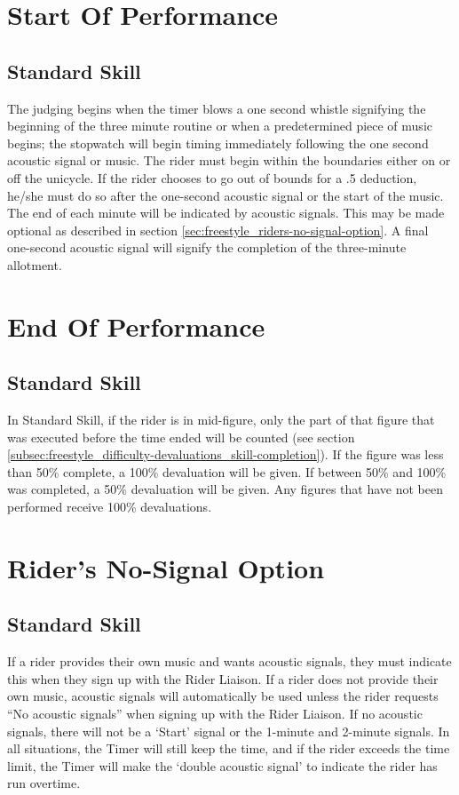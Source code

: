 \section{Start Of Performance}

\subsection{Standard Skill}
The judging begins when the timer blows a one second whistle signifying the beginning of the three minute routine or when a predetermined piece of music begins; the stopwatch will begin timing immediately following the one second acoustic signal or music.
The rider must begin within the boundaries either on or off the unicycle.
If the rider chooses to go out of bounds for a .5 deduction, he/she must do so after the one-second acoustic signal or the start of the music.
The end of each minute will be indicated by acoustic signals.
This may be made optional as described in section \ref{sec:freestyle_riders-no-signal-option}.
A final one-second acoustic signal will signify the completion of the three-minute allotment.

\section{End Of Performance}

\subsection{Standard Skill}
In Standard Skill, if the rider is in mid-figure, only the part of that figure that was executed before the time ended will be counted (see section \ref{subsec:freestyle_difficulty-devaluations_skill-completion}).
If the figure was less than 50\% complete, a 100\% devaluation will be given.
If between 50\% and 100\% was completed, a 50\% devaluation will be given.
Any figures that have not been performed receive 100\% devaluations.

\section{Rider's No-Signal Option \label{sec:freestyle_riders-no-signal-option}}

\subsection{Standard Skill}
If a rider provides their own music and wants acoustic signals, they must indicate this when they sign up with the Rider Liaison.
If a rider does not provide their own music, acoustic signals will automatically be used unless the rider requests ``No acoustic signals'' when signing up with the Rider Liaison.
If no acoustic signals, there will not be a `Start' signal or the 1-minute and 2-minute signals.
In all situations, the Timer will still keep the time, and if the rider exceeds the time limit, the Timer will make the `double acoustic signal' to indicate the rider has run overtime.

